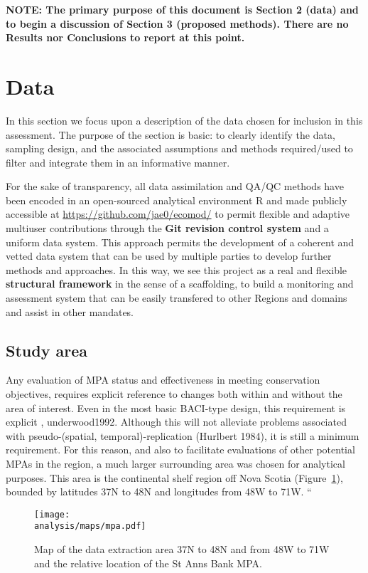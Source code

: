 \documentclass[letterpaper,portrait,11pt]{scrartcl}
\numberwithin{equation}{section}		%
\numberwithin{figure}{section}		%
\numberwithin{table}{section}				%
\newcommand{\ecomod}{\string~/ecomod_data/}   %
\newcommand{\analysis}{\ecomod/mpa/analysis/}   %
\begin{document}
\medskip

\textbf{NOTE: The primary purpose of this document is Section 2 (data) and to begin a discussion of Section 3 (proposed methods). There are no Results nor Conclusions to report at this point. }


\section{Data} 

In this section we focus upon a description of the data chosen for inclusion in this assessment. The purpose of the section is basic: to clearly identify the data, sampling design, and the associated assumptions and methods required/used to filter and integrate them in an informative manner. 

For the sake of transparency, all data assimilation and QA/QC methods have been encoded in an open-sourced analytical environment R \parencite{rCran} and made publicly accessible at \url{https://github.com/jae0/ecomod/} to permit flexible and adaptive multiuser contributions through the \textbf{Git revision control system} and a uniform  data system. This approach permits the development of a coherent and vetted data system that can be used by multiple parties to develop further methods and approaches. In this way, we see this project as a real and flexible \textbf{structural framework} in the sense of a scaffolding, to build a monitoring and assessment system that can be easily transfered to other Regions and domains and assist in other mandates. 


\subsection{Study area}
Any evaluation of MPA status and effectiveness in meeting conservation objectives, requires explicit reference to changes both within and without the area of interest. Even in the most basic BACI-type design, this requirement is explicit \parencite{green:1979}, underwood1992. Although this will not alleviate problems associated with pseudo-(spatial, temporal)-replication (Hurlbert 1984), it is still a minimum requirement. For this reason, and also to facilitate evaluations of other potential MPAs in the region, a much larger surrounding area was chosen for analytical purposes. This area is the continental shelf region off Nova Scotia (Figure~\ref{fig:SAB}), bounded by latitudes 37N to 48N and longitudes from 48W to 71W.  ``

\begin{figure}[h]
  \caption{Map of the data extraction area 37N to 48N and from 48W to 71W and the relative location of the St Anns Bank MPA.}
  \label{fig:SAB}
  \centering
  \texttt{[image: \\analysis/maps/mpa.pdf]}

\end{figure}
\end{document}
